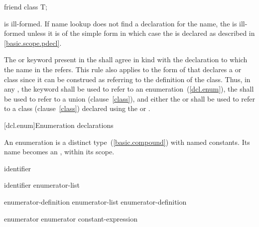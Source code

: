 \begin{codeblock}
friend class T;
\end{codeblock}

is ill-formed.
\exitnote
If name lookup does not find a declaration for the name, the
 is ill-formed unless it is of the
simple form   in which case
the  is declared as described in
\ref{basic.scope.pdecl}.

\pnum
The  or  keyword
present in the
 shall agree in kind with the
declaration to which the name in the
 refers. This rule also applies to
the form of  that declares a
 or  class since it can be construed
as referring to the definition of the class. Thus, in any
, the  keyword
shall be
used to refer to an enumeration~(\ref{dcl.enum}), the 
 shall be used to refer to a union
(clause~\ref{class}), and either the  or 
 shall be used to refer to a class
(clause~\ref{class}) declared using the  or 
.

[dcl.enum]{Enumeration declarations}%
%
%

\pnum
An enumeration is a distinct type~(\ref{basic.compound}) with named
constants. Its name becomes an , within its scope.

\begin{bnf}
\br
    identifier
\end{bnf}

\begin{bnf}
\br
     identifier\opt \terminal{\{} enumerator-list\opt \terminal{\}}
\end{bnf}

\begin{bnf}
\br
    enumerator-definition\br
    enumerator-list \terminal{,} enumerator-definition
\end{bnf}

\begin{bnf}
\br
    enumerator\br
    enumerator \terminal{=} constant-expression
\end{bnf}

